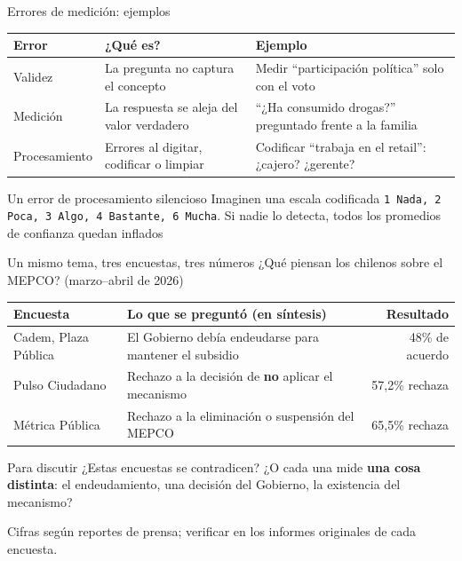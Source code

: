 \documentclass[aspectratio=169,11pt]{beamer}
\newcommand{\hlr}[1]{\textcolor{acero}{\textbf{#1}}}        %
\newcommand{\code}[1]{\texttt{\small #1}}                    %
\newcommand{\fuente}[1]{\par\vfill{\scriptsize\color{gris}#1\par}}
\begin{document}
\begin{frame}{Errores de medición: ejemplos}
\begin{center}
\small
\begin{tabular}{>{\raggedright}p{}>{\raggedright}p{}p{}}
\toprule
\textbf{Error} & \textbf{¿Qué es?} & \textbf{Ejemplo} \\
\midrule
\rowcolor{crema}
Validez & La pregunta no captura el concepto & Medir ``participación política'' solo con el voto \\
Medición & La respuesta se aleja del valor verdadero & ``¿Ha consumido drogas?'' preguntado frente a la familia \\
\rowcolor{crema}
Procesamiento & Errores al digitar, codificar o limpiar & Codificar ``trabaja en el retail'': ¿cajero? ¿gerente? \\
\bottomrule
\end{tabular}
\end{center}
\bigskip
\begin{alertblock}{Un error de procesamiento silencioso}
\small
Imaginen una escala codificada \code{1 Nada, 2 Poca, 3 Algo, 4 Bastante, 6 Mucha}. Si nadie lo detecta, todos los promedios de confianza quedan inflados
\end{alertblock}
\end{frame}

\begin{frame}{Un mismo tema, tres encuestas, tres números}
\small
¿Qué piensan los chilenos sobre el MEPCO? (marzo--abril de 2026)
\bigskip

\begin{center}
\begin{tabular}{>{\raggedright}p{}>{\raggedright}p{}r}
\toprule
\textbf{Encuesta} & \textbf{Lo que se preguntó (en síntesis)} & \textbf{Resultado} \\
\midrule
\rowcolor{crema}
Cadem, Plaza Pública & El Gobierno debía endeudarse para mantener el subsidio & 48\% de acuerdo \\
Pulso Ciudadano & Rechazo a la decisión de \textbf{no} aplicar el mecanismo & 57,2\% rechaza \\
\rowcolor{crema}
Métrica Pública & Rechazo a la eliminación o suspensión del MEPCO & 65,5\% rechaza \\
\bottomrule
\end{tabular}
\end{center}
\bigskip
\begin{alertblock}{Para discutir}
\small
¿Estas encuestas se contradicen? ¿O cada una mide \hlr{una cosa distinta}: el endeudamiento, una decisión del Gobierno, la existencia del mecanismo?
\end{alertblock}
\fuente{Cifras según reportes de prensa; verificar en los informes originales de cada encuesta.}
\end{frame}
\end{document}
